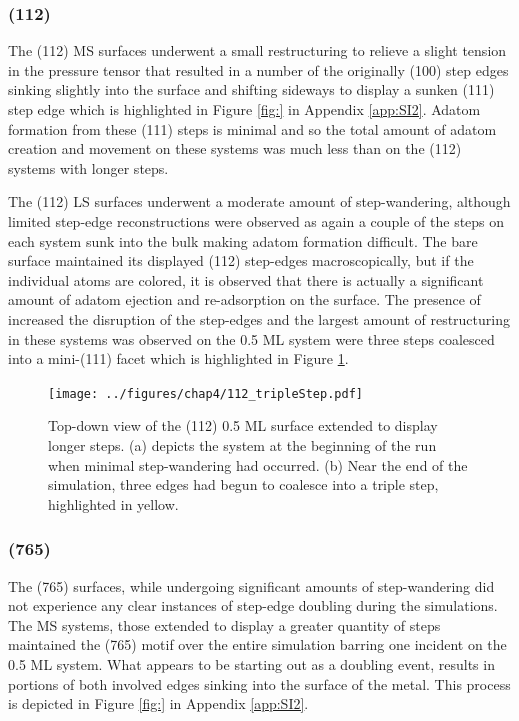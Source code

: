 \subsubsection{ (112)}
The (112) MS surfaces underwent a small restructuring to relieve a slight
tension in the pressure tensor that resulted in a number of the
originally (100) step edges sinking slightly into the surface and shifting
sideways to display a sunken (111) step edge which is highlighted in Figure
\ref{fig:} in Appendix \ref{app:SI2}.  Adatom formation from these (111)
steps is minimal and so the total amount of adatom creation and movement on
these systems was much less than on the (112) systems with longer steps. 

The (112) LS surfaces underwent a moderate amount of step-wandering, although
limited step-edge reconstructions were observed as again a couple of the steps
on each system sunk into the bulk making adatom formation difficult.  The bare
surface maintained its displayed (112) step-edges macroscopically, but if the
individual atoms are colored, it is observed that there is actually a
significant amount of adatom ejection and re-adsorption on the surface. The
presence of  increased the disruption of the step-edges and the largest
amount of restructuring in these systems was observed on the 0.5 ML system were
three steps coalesced into a mini-(111) facet which is highlighted in Figure
\ref{fig:tripleStep}.

\begin{figure}
\centering
  \texttt{[image: ../figures/chap4/112\_tripleStep.pdf]}
  \caption{Top-down view of the (112) 0.5 ML surface extended to display longer
steps. (a) depicts the system at the beginning of the run when minimal
step-wandering had occurred. (b) Near the end of the simulation, three edges
had begun to coalesce into a triple step, highlighted in yellow.}
  \label{fig:tripleStep}
\end{figure}

\subsubsection{ (765)}
The (765) surfaces, while undergoing significant amounts of step-wandering did
not experience any clear instances of step-edge doubling during the
simulations. The MS systems, those extended to display a greater quantity of
steps maintained the (765) motif over the entire simulation barring one
incident on the 0.5 ML system. What appears to be starting out as a doubling
event, results in portions of both involved edges sinking into the surface of
the metal. This process is depicted in Figure \ref{fig:} in Appendix \ref{app:SI2}.


